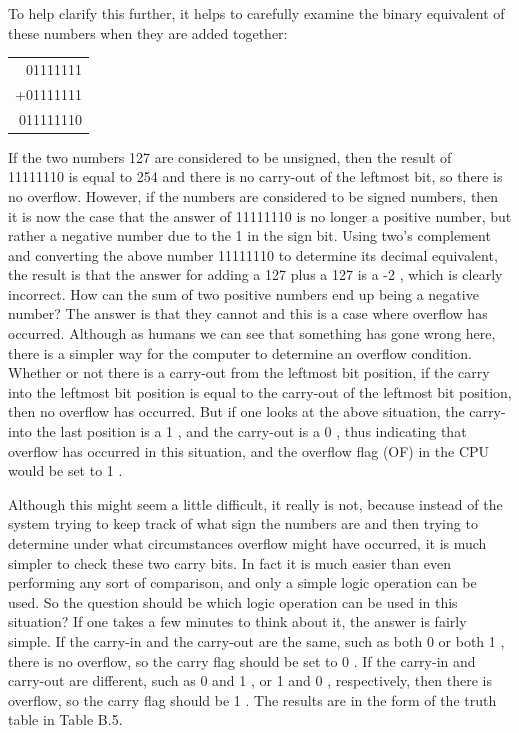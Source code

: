 \documentclass[10pt]{book}
\begin{document}
To help clarify this further, it helps to carefully examine the binary equivalent of these numbers when they are added together:

\begin{center}
\begin{tabular}{r}
01111111 \\
+01111111 \\
\hline
011111110 \\
\hline
\end{tabular}
\end{center}

If the two numbers 127 are considered to be unsigned, then the result of 11111110 is equal to 254 and there is no carry-out of the leftmost bit, so there is no overflow. However, if the numbers are considered to be signed numbers, then it is now the case that the answer of 11111110 is no longer a positive number, but rather a negative number due to the 1 in the sign bit. Using two's complement and converting the above number 11111110 to determine its decimal equivalent, the result is that the answer for adding a 127 plus a 127 is a -2 , which is clearly incorrect. How can the sum of two positive numbers end up being a negative number? The answer is that they cannot and this is a case where overflow has occurred. Although as humans we can see that something has gone wrong here, there is a simpler way for the computer to determine an overflow condition. Whether or not there is a carry-out from the leftmost bit position, if the carry into the leftmost bit position is equal to the carry-out of the leftmost bit position, then no overflow has occurred. But if one looks at the above situation, the carry-into the last position is a 1 , and the carry-out is a 0 , thus indicating that overflow has occurred in this situation, and the overflow flag (OF) in the CPU would be set to 1 .

Although this might seem a little difficult, it really is not, because instead of the system trying to keep track of what sign the numbers are and then trying to determine under what circumstances overflow might have occurred, it is much simpler to check these two carry bits. In fact it is much easier than even performing any sort of comparison, and only a simple logic operation can be used. So the question should be which logic operation can be used in this situation? If one takes a few minutes to think about it, the answer is fairly simple. If the carry-in and the carry-out are the same, such as both 0 or both 1 , there is no overflow, so the carry flag should be set to 0 . If the carry-in and carry-out are different, such as 0 and 1 , or 1 and 0 , respectively, then there is overflow, so the carry flag should be 1 . The results are in the form of the truth table in Table B.5.
\end{document}
